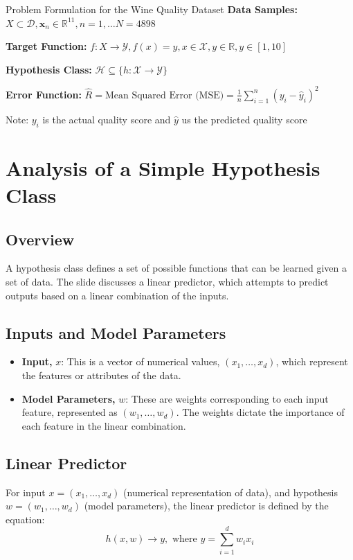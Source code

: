 \begin{examplebox}{Problem Formulation for the Wine Quality Dataset}
\textbf{Data Samples:} $X\subset\mathcal{D},\mathbf{x}_n\in\mathbb{R}^{11}, n=1, \ldots N=4898$

\textbf{Target Function:} $f:X\to\mathcal{Y},f(x)=y,x\in\mathcal{X},y\in\mathbb{R},y\in[1,10]$

\textbf{Hypothesis Class:} \( \mathcal{H} \subseteq \{ h: \mathcal{X} \rightarrow \mathcal{Y} \} \)

\textbf{Error Function:} $\widehat{R} = \text{Mean Squared Error (MSE)} = \frac{1}{n} \sum_{i=1}^{n} (y_i - \hat{y}_i)^2$ 

Note: $y_i$ is the actual quality score and $\hat{y}$ us the predicted quality score
\end{examplebox}

\section{Analysis of a Simple Hypothesis Class}

\subsection{Overview}
A hypothesis class defines a set of possible functions that can be learned given a set of data. The slide discusses a linear predictor, which attempts to predict outputs based on a linear combination of the inputs.

\subsection{Inputs and Model Parameters}
\begin{itemize}
    \item \textbf{Input,} $x$: This is a vector of numerical values, $(x_1, \dots, x_d)$, which represent the features or attributes of the data.
    \item \textbf{Model Parameters,} $w$: These are weights corresponding to each input feature, represented as $(w_1, \dots, w_d)$. The weights dictate the importance of each feature in the linear combination.
\end{itemize}

\subsection{Linear Predictor}
For input $x=(x_1,\ldots,x_d)$ (numerical representation of data), and hypothesis $w=(w_1,\ldots,w_d)$
(model parameters), the linear predictor is defined by the equation:
\[
h(x, w) \to y, \text{ where } y = \sum_{i=1}^{d} w_ix_i
\]

